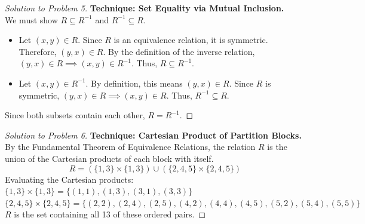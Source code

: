 \documentclass[11pt, a4paper]{article}
\theoremstyle{definition}
\theoremstyle{remark}
\begin{document}
\begin{proof}[Solution to Problem 5]
    \textbf{Technique: Set Equality via Mutual Inclusion.} \\
    We must show $R \subseteq R^{-1}$ and $R^{-1} \subseteq R$.
    \begin{itemize}
        \item Let $(x, y) \in R$. Since $R$ is an equivalence relation, it is symmetric. Therefore, $(y, x) \in R$. By the definition of the inverse relation, $(y, x) \in R \implies (x, y) \in R^{-1}$. Thus, $R \subseteq R^{-1}$.
        \item Let $(x, y) \in R^{-1}$. By definition, this means $(y, x) \in R$. Since $R$ is symmetric, $(y, x) \in R \implies (x, y) \in R$. Thus, $R^{-1} \subseteq R$.
    \end{itemize}
    Since both subsets contain each other, $R = R^{-1}$.
\end{proof}

\begin{proof}[Solution to Problem 6]
    \textbf{Technique: Cartesian Product of Partition Blocks.} \\
    By the Fundamental Theorem of Equivalence Relations, the relation $R$ is the union of the Cartesian products of each block with itself.
    \[ R = (\{1, 3\} \times \{1, 3\}) \cup (\{2, 4, 5\} \times \{2, 4, 5\}) \]
    Evaluating the Cartesian products:
    $\{1, 3\} \times \{1, 3\} = \{(1,1), (1,3), (3,1), (3,3)\}$ \\
    $\{2, 4, 5\} \times \{2, 4, 5\} = \{(2,2), (2,4), (2,5), (4,2), (4,4), (4,5), (5,2), (5,4), (5,5)\}$ \\
    $R$ is the set containing all 13 of these ordered pairs.
    
    \vspace{1em}
\end{proof}
\end{document}
